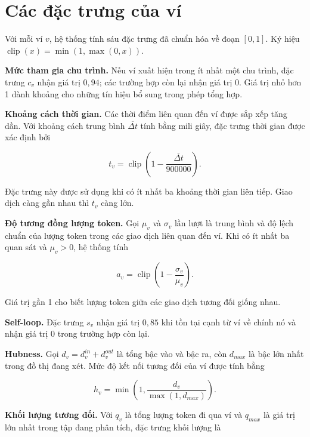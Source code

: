 \section{Các đặc trưng của ví}

Với mỗi ví $v$, hệ thống tính sáu đặc trưng đã chuẩn hóa về đoạn $[0,1]$. Ký hiệu $\operatorname{clip}(x)=\min(1,\max(0,x))$.

\textbf{Mức tham gia chu trình.} Nếu ví xuất hiện trong ít nhất một chu trình, đặc trưng $c_v$ nhận giá trị $0{,}94$; các trường hợp còn lại nhận giá trị 0. Giá trị nhỏ hơn 1 dành khoảng cho những tín hiệu bổ sung trong phép tổng hợp.

\textbf{Khoảng cách thời gian.} Các thời điểm liên quan đến ví được sắp xếp tăng dần. Với khoảng cách trung bình $\overline{\Delta t}$ tính bằng mili giây, đặc trưng thời gian được xác định bởi

\begin{equation}
t_v=\operatorname{clip}\left(1-\frac{\overline{\Delta t}}{900000}\right).
\end{equation}

Đặc trưng này được sử dụng khi có ít nhất ba khoảng thời gian liên tiếp. Giao dịch càng gần nhau thì $t_v$ càng lớn.

\textbf{Độ tương đồng lượng token.} Gọi $\mu_v$ và $\sigma_v$ lần lượt là trung bình và độ lệch chuẩn của lượng token trong các giao dịch liên quan đến ví. Khi có ít nhất ba quan sát và $\mu_v>0$, hệ thống tính

\begin{equation}
a_v=\operatorname{clip}\left(1-\frac{\sigma_v}{\mu_v}\right).
\end{equation}

Giá trị gần 1 cho biết lượng token giữa các giao dịch tương đối giống nhau.

\textbf{Self-loop.} Đặc trưng $s_v$ nhận giá trị $0{,}85$ khi tồn tại cạnh từ ví về chính nó và nhận giá trị 0 trong trường hợp còn lại.

\textbf{Hubness.} Gọi $d_v=d_v^{in}+d_v^{out}$ là tổng bậc vào và bậc ra, còn $d_{max}$ là bậc lớn nhất trong đồ thị đang xét. Mức độ kết nối tương đối của ví được tính bằng

\begin{equation}
h_v=\min\left(1,\frac{d_v}{\max(1,d_{max})}\right).
\end{equation}

\textbf{Khối lượng tương đối.} Với $q_v$ là tổng lượng token đi qua ví và $q_{max}$ là giá trị lớn nhất trong tập đang phân tích, đặc trưng khối lượng là

